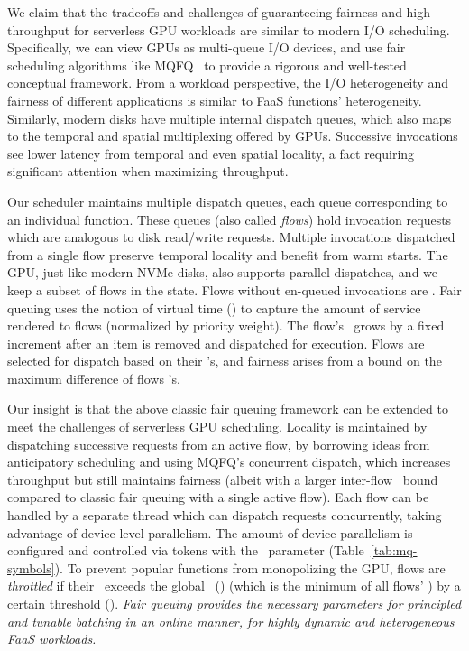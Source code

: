 We claim that the tradeoffs and challenges of guaranteeing fairness and high throughput for serverless GPU workloads are similar to modern I/O scheduling.
Specifically, we can view GPUs as multi-queue I/O devices, and use fair scheduling algorithms like MQFQ~\cite{hedayati2019multi} to provide a rigorous and well-tested conceptual framework.
From a workload perspective, the I/O heterogeneity and fairness of different applications is similar to FaaS functions' heterogeneity.
Similarly, modern disks have multiple internal dispatch queues, which also maps to the temporal and spatial multiplexing offered by GPUs.
Successive invocations see lower latency from temporal and even spatial locality, a fact requiring significant attention when maximizing throughput.

Our scheduler maintains multiple dispatch queues, each queue corresponding to an individual function.
These queues (also called \emph{flows}) hold invocation requests which are analogous to disk read/write requests.
Multiple invocations dispatched from a single flow preserve temporal locality and benefit from warm starts.
The GPU, just like modern NVMe disks, also supports parallel dispatches, and we keep a subset of flows in the  state.
Flows without en-queued invocations are .
Fair queuing uses the notion of virtual time (\VT) to capture the amount of service rendered to flows (normalized by priority weight).
The flow's \VT~grows by a fixed increment after an item is removed and dispatched for execution.
Flows are selected for dispatch based on their \VT's, and fairness arises from a bound on the maximum difference of flows \VT's.

Our insight is that the above classic fair queuing framework can be extended to meet the challenges of serverless GPU scheduling.
Locality is maintained by dispatching successive requests from an active flow, by borrowing ideas from anticipatory scheduling and using MQFQ's concurrent dispatch, which increases throughput but still maintains fairness (albeit with a larger inter-flow \VT~bound compared to classic fair queuing with a single active flow).
Each flow can be handled by a separate thread which can dispatch requests concurrently, taking advantage of device-level parallelism.
The amount of device parallelism is configured and controlled via tokens with the \D~parameter (Table~\ref{tab:mq-symbols}). 
To prevent popular functions from monopolizing the GPU, flows are \emph{throttled} if their \VT~exceeds the global \VT~(\GlobVT) (which is the minimum of all flows' \VT) by a certain threshold (\T).
\emph{Fair queuing provides the necessary parameters for principled and tunable batching in an online manner, for highly dynamic and heterogeneous FaaS workloads.}


